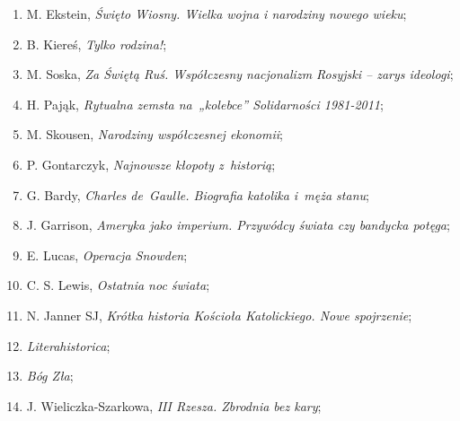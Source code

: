 \documentclass[a4paper,11pt]{article}
\begin{document}
\begin{enumerate}
\item M. Ekstein, \textit{Święto Wiosny. Wielka wojna i narodziny nowego
    wieku};



\item B. Kiereś, \textit{Tylko rodzina!};



\item M. Soska, \textit{Za Świętą Ruś. Współczesny nacjonalizm Rosyjski
    -- zarys ideologi};



\item H. Pająk, \textit{Rytualna zemsta na~„kolebce” Solidarności
    1981-2011};



\item M. Skousen, \textit{Narodziny współczesnej ekonomii};



\item P. Gontarczyk, \textit{Najnowsze kłopoty z~historią};



\item G. Bardy, \textit{Charles de~Gaulle. Biografia katolika i~męża
    stanu};



\item J. Garrison, \textit{Ameryka jako imperium. Przywódcy świata czy
    bandycka potęga};



\item E. Lucas, \textit{Operacja Snowden};



\item C. S. Lewis, \textit{Ostatnia noc świata};



\item N. Janner SJ, \textit{Krótka historia Kościoła Katolickiego. Nowe
    spojrzenie};



\item \textit{Literahistorica};



\item \textit{Bóg Zła};



\item J. Wieliczka-Szarkowa, \textit{III Rzesza. Zbrodnia bez kary};




\end{enumerate}
\end{document}
